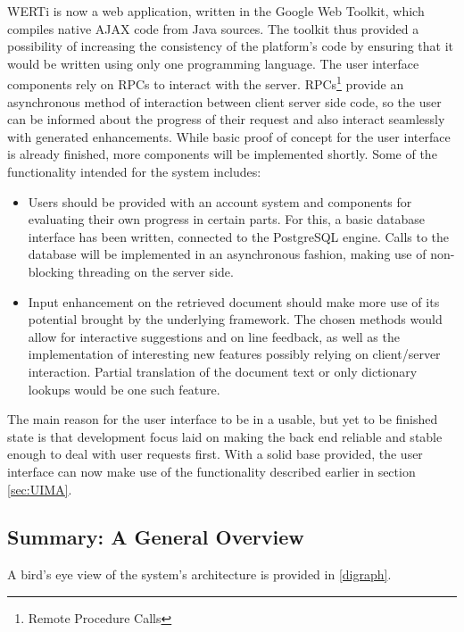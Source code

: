 \documentclass[12pt]{scrartcl}
\begin{document}
WERTi is now a web application, written in the Google Web Toolkit, which
compiles native AJAX code from Java sources. The toolkit thus provided a
possibility of increasing the consistency of the platform's code by ensuring
that it would be written using only one programming language. The user interface
components rely on RPCs to interact with the server. RPCs\footnote{Remote
Procedure Calls} provide an asynchronous method of interaction between client
server side code, so the user can be informed about the progress of their
request and also interact seamlessly with generated enhancements. While basic
proof of concept for the user interface is already finished, more components
will be implemented shortly. Some of the functionality intended for the system
includes:
\begin{itemize}
  \item Users should be provided with an account system and components for
    evaluating their own progress in certain parts. For this, a basic database
    interface has been written, connected to the PostgreSQL engine. Calls to the
    database will be implemented in an asynchronous fashion, making use of
    non-blocking threading on the server side.
  \item Input enhancement on the retrieved document should make more use of its
    potential brought by the underlying framework. The chosen methods would
    allow for interactive suggestions and on line feedback, as well as the
    implementation of interesting new features possibly relying on client/server
    interaction. Partial translation of the document text or only dictionary
    lookups would be one such feature.
\end{itemize}

The main reason for the user interface to be in a usable, but yet to be finished
state is that development focus laid on making the back end reliable and stable
enough to deal with user requests first. With a solid base provided, the user
interface can now make use of the functionality described earlier in section
\ref{sec:UIMA}.

\subsection{Summary: A General Overview}

A bird's eye view of the system's architecture is provided in \ref{digraph}.
\end{document}
